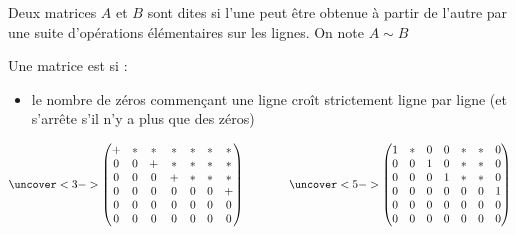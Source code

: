 \begin{frame}
\vspace*{-1ex}
\begin{mydefinition} 
Deux matrices $A$ et $B$ sont dites  si l'une 
peut être obtenue à partir de l'autre par une suite d'opérations 
élémentaires sur les lignes. On note $A \sim B$
\end{mydefinition} 
\pause\vspace*{-1ex}
\begin{mydefinition}
Une matrice est  si :
\begin{itemize}
  \item le nombre de zéros commençant une ligne croît strictement ligne par ligne 
  (et s'arrête s'il n'y a plus que des zéros)
\end{itemize}  
\end{mydefinition}
\vspace*{-2ex}
{\footnotesize
$$\uncover<3->{
\begin{pmatrix}
+ & * & * & * & * & * & * \\
0 & 0 & + & * & * & * & * \\
0 & 0 & 0 & + & * & * & * \\
0 & 0 & 0 & 0 & 0 & 0 & + \\
0 & 0 & 0 & 0 & 0 & 0 & 0 \\
0 & 0 & 0 & 0 & 0 & 0 & 0 \\
\end{pmatrix}
}
\qquad \qquad
\uncover<5->{
\begin{pmatrix}
1 & * & 0 & 0 & * & * & 0 \\
0 & 0 & 1 & 0 & * & * & 0 \\
0 & 0 & 0 & 1 & * & * & 0 \\
0 & 0 & 0 & 0 & 0 & 0 & 1 \\
0 & 0 & 0 & 0 & 0 & 0 & 0 \\
0 & 0 & 0 & 0 & 0 & 0 & 0 \\
\end{pmatrix}
}
$$
}
\end{frame}


